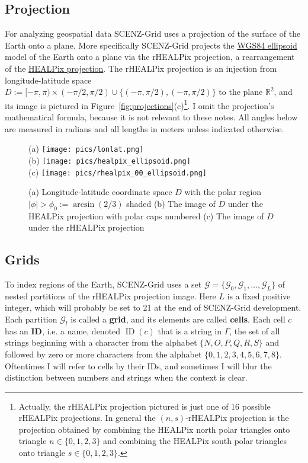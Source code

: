 \documentclass[12pt,a4paper]{amsart}
\numberwithin{figure}{section}
\newcommand{\hl}[1]{\textnormal{\textbf{#1}}} %
\newcommand{\reals}{\mathbb{R}}
\newcommand{\cG}{\mathcal{G}}
\newcommand{\maxlevel}{L}
\DeclareMathOperator{\id}{ID}
\begin{document}
\subsection{Projection}

For analyzing geospatial data SCENZ-Grid uses a projection of the surface of the Earth onto a plane.
More specifically SCENZ-Grid projects the \href{http://en.wikipedia.org/wiki/WGS84}{WGS84 ellipsoid} model of the Earth onto a plane via the rHEALPix projection, a rearrangement of the  \href{http://en.wikipedia.org/wiki/Healpix}{HEALPix projection}.
The rHEALPix projection is an injection from longitude-latitude space $D := [-\pi, \pi) \times (-\pi/2, \pi/2) \cup \{ (-\pi, \pi/2), (-\pi, \pi/2)\}$ to the plane $\reals^2$, and its image is pictured in Figure~\ref{fig:projections}(c)\footnote{
Actually, the rHEALPix projection pictured is just one of 16 possible rHEALPix projections.
In general the $(n, s)$-rHEALPix projection is the projection obtained by combining the HEALPix north polar triangles onto triangle $n \in \{0,1,2,3\}$ and combining the HEALPix south polar triangles onto triangle $s \in \{0,1,2,3\}$.
}.
I omit the projection's mathematical formula, because it is not relevant to these notes.
All angles below are measured in radians and all lengths in meters unless indicated otherwise.

\begin{figure}[htb]
(a) \texttt{[image: pics/lonlat.png]} \\
(b) \texttt{[image: pics/healpix\_ellipsoid.png]} \\
(c) \texttt{[image: pics/rhealpix\_00\_ellipsoid.png]}
\caption{
(a) Longitude-latitude coordinate space $D$ with the polar region $|\phi|>\phi_0 := \arcsin(2/3) $ shaded 
(b) The image of $D$ under the HEALPix projection with polar caps numbered
(c) The image of $D$ under the rHEALPix projection
}
\end{figure}
\label{fig:projections}

\subsection{Grids}

To index regions of the Earth, SCENZ-Grid uses a set $\cG = \{\cG_0, \cG_1, \ldots, \cG_\maxlevel\}$ of nested partitions of the rHEALPix projection image.
Here $\maxlevel$ is a fixed positive integer, which will probably be set to 21 at the end of SCENZ-Grid development. 
Each partition $\cG_l$ is called a \hl{grid}, and its elements are called \hl{cells}. 
Each cell $c$ has an \hl{ID}, i.e. a name, denoted $\id(c)$ that is a string in $\Gamma$, the set of all strings beginning with a character from the alphabet $\{N, O, P, Q, R, S\}$ and followed by zero or more characters from the alphabet $\{0, 1, 2, 3, 4, 5, 6, 7, 8\}$.
Oftentimes I will refer to cells by their IDs, and sometimes I will blur the distinction between numbers and strings when the context is clear.
\end{document}
